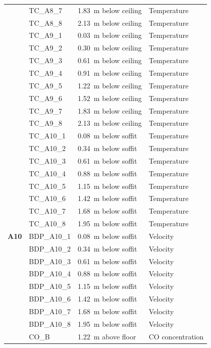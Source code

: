 \documentclass[12pt,oneside]{book}
\begin{document}
\begin{longtable}[c]{c|lll}
 & TC\_A8\_7  & 1.83~m below ceiling & Temperature \\
 & TC\_A8\_8  & 2.13~m below ceiling & Temperature \\
\bottomrule
\newpage
\multirow{8}{*}{\large{\textbf{A9}}}
 & TC\_A9\_1  & 0.03~m below ceiling & Temperature \\
 & TC\_A9\_2  & 0.30~m below ceiling & Temperature \\
 & TC\_A9\_3  & 0.61~m below ceiling & Temperature \\
 & TC\_A9\_4  & 0.91~m below ceiling & Temperature \\
 & TC\_A9\_5  & 1.22~m below ceiling & Temperature \\
 & TC\_A9\_6  & 1.52~m below ceiling & Temperature \\
 & TC\_A9\_7  & 1.83~m below ceiling & Temperature \\
 & TC\_A9\_8  & 2.13~m below ceiling & Temperature \\
\midrule
\multirow{19}{*}{\large\textbf{A10}}
 & TC\_A10\_1  & 0.08~m below soffit  & Temperature \\
 & TC\_A10\_2  & 0.34~m below soffit  & Temperature \\
 & TC\_A10\_3  & 0.61~m below soffit  & Temperature \\
 & TC\_A10\_4  & 0.88~m below soffit  & Temperature \\
 & TC\_A10\_5  & 1.15~m below soffit  & Temperature \\
 & TC\_A10\_6  & 1.42~m below soffit  & Temperature \\
 & TC\_A10\_7  & 1.68~m below soffit  & Temperature \\
 & TC\_A10\_8  & 1.95~m below soffit  & Temperature \\
\cline{2-4}
 & BDP\_A10\_1 & 0.08~m below soffit  & Velocity \\
 & BDP\_A10\_2 & 0.34~m below soffit  & Velocity \\
 & BDP\_A10\_3 & 0.61~m below soffit  & Velocity \\
 & BDP\_A10\_4 & 0.88~m below soffit  & Velocity \\
 & BDP\_A10\_5 & 1.15~m below soffit  & Velocity \\
 & BDP\_A10\_6 & 1.42~m below soffit  & Velocity \\
 & BDP\_A10\_7 & 1.68~m below soffit  & Velocity \\
 & BDP\_A10\_8 & 1.95~m below soffit  & Velocity \\
\cline{2-4}
 & CO\_B      & 1.22~m above floor   & CO concentration \\

\end{longtable}
\end{document}
